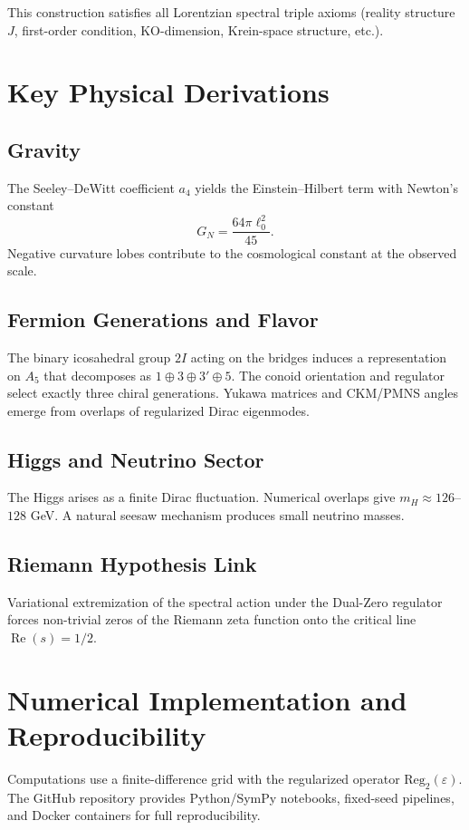 \documentclass[11pt,a4paper]{article}
\begin{document}
This construction satisfies all Lorentzian spectral triple axioms (reality structure \(J\), first-order condition, KO-dimension, Krein-space structure, etc.).

\section{Key Physical Derivations}

\subsection{Gravity}
The Seeley–DeWitt coefficient \(a_4\) yields the Einstein–Hilbert term with Newton's constant
\[
G_N = \frac{64\pi \ell_0^2}{45}.
\]
Negative curvature lobes contribute to the cosmological constant at the observed scale.

\subsection{Fermion Generations and Flavor}
The binary icosahedral group \(2I\) acting on the bridges induces a representation on \(A_5\) that decomposes as \(1 \oplus 3 \oplus 3' \oplus 5\). The conoid orientation and regulator select exactly three chiral generations. Yukawa matrices and CKM/PMNS angles emerge from overlaps of regularized Dirac eigenmodes.

\subsection{Higgs and Neutrino Sector}
The Higgs arises as a finite Dirac fluctuation. Numerical overlaps give \(m_H \approx 126\)--\(128\) GeV. A natural seesaw mechanism produces small neutrino masses.

\subsection{Riemann Hypothesis Link}
Variational extremization of the spectral action under the Dual-Zero regulator forces non-trivial zeros of the Riemann zeta function onto the critical line \(\operatorname{Re}(s) = 1/2\).

\section{Numerical Implementation and Reproducibility}

Computations use a finite-difference grid with the regularized operator \(\mathrm{Reg}_2(\varepsilon)\). The GitHub repository provides Python/SymPy notebooks, fixed-seed pipelines, and Docker containers for full reproducibility.
\end{document}
